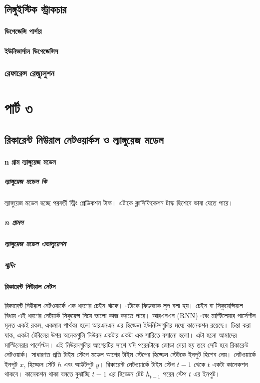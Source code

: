 \documentclass{book}
\begin{document}
\chapter{লিঙ্গুইস্টিক স্ট্রাকচার}
\subsection{ডিপেন্ডেন্সি পার্সার}
\subsection{ইউনিভার্সাল ডিপেন্ডেন্সিস}

\section{রেফারেন্স রেজ্যুলুশন}

 \part{পার্ট ৩} 
\chapter{রিকারেন্ট নিউরাল নেটওয়ার্কস ও ল্যাঙ্গুয়েজ মডেল}
\subsection{n গ্রাম ল্যাঙ্গুয়েজ মডেল}
\subsubsection{ল্যাঙ্গুয়েজ মডেল কি}
ল্যাঙ্গুয়েজ মডেল হচ্ছে পরবর্তী স্ট্রিং প্রেডিকশন টাস্ক। এটাকে ক্লাসিফিকেশন টাস্ক হিশেবে ভাবা যেতে পারে।
\subsubsection{n গ্রামস}
\subsubsection{ল্যাঙ্গুয়েজ মডেল এভালুয়েশন}
\subsubsection{স্মুদিং}

\subsection{রিকারেন্ট নিউরাল নেটস}
রিকারেন্ট নিউরাল নেটওয়ার্কে \cite{6302929} এক ধরণের চেইন থাকে। এটাকে ফিডব্যাক লুপ বলা হয়। চেইন বা সিকুয়েন্সিয়াল বিধায় এই ধরণের নেটয়ার্ক সিকুয়েন্স নিয়ে ভালো কাজ করতে পারে। 
আরএনএন (RNN) এবং মাল্টিলেয়ার পার্সেপ্টন মূলত একই রকম, একমাত্র পার্থক্য হলো আরএনএন এর হিড্ডেন ইউনিটসগুলির মধ্যে কানেকশন রয়েছে।
চিন্তা করা যাক, একটা টেবিলের উপর অনেকগুলি নিউরন একটার একটা এক সারিতে বসানো হলো। এটা হলো আমাদের মাল্টিলেয়ার পার্সেপ্টন।
এই নিউরনগুলির আগেরটির সাথে যদি পরেরটাকে জোড়া দেয়া হয় তবে সেটি হবে রিকারেন্ট নেটওয়ার্ক। 
সাধারণত প্রতি টাইম স্টেপে মডেল আগের টাইম স্টেপের হিড্ডেন স্টেটকে ইনপুট হিশেব নেয়। নেটওয়ার্কে ইনপুট $x$, হিড্ডেন স্টেট $h$ এবং আউটপুট $y$। 
রিকারেন্ট নেটওয়ার্কে টাইম স্টেপ  $t-1$ থেকে $t$ একটা কানেকশন থাকবে। কানেকশন থাকা বলতে বুঝাচ্ছি $t-1$ এর হিড্ডেন ষ্টেট $h_{t-1}$ পরের স্টেপ $t$ এর ইনপুট। 
\end{document}
